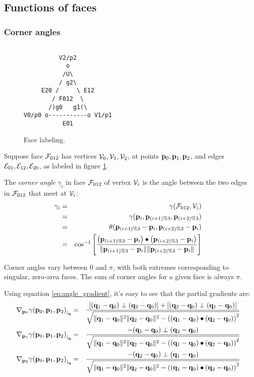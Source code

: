 \subsection{Functions of faces}
\label{sec:faces}



\subsubsection{Corner angles}
\label{sec:corner_angles}

\begin{figure}[!htp]
\centering
\begin{verbatim}

          V2/p2
            o
           /U\
          / g2\
     E20 /     \ E12
        / F012  \
       /)g0   g1(\
V0/p0 o-----------o V1/p1
           E01

\end{verbatim}
\caption{Face labeling.
\label{fig:face_labeling}}
\end{figure}

Suppose face ${\mathcal F}_{012}$ has vertices ${\mathcal V}_0, {\mathcal V}_1, {\mathcal V}_2$,
at points ${\mathbf p}_0, {\mathbf p}_1, {\mathbf p}_2$,
and edges ${\mathcal E}_{01}, {\mathcal E}_{12}, {\mathcal E}_{20}$,
as labeled in figure \ref{fig:face_labeling}.

The {\em corner angle} $\gamma_i$ in face ${\mathcal F}_{012}$ of vertex ${\mathcal V}_i$ is
the angle between the two edges in ${\mathcal F}_{012}$ that meet at ${\mathcal V}_i$:
\begin{eqnarray}
\gamma_i
& = & \gamma({\mathcal F}_{012},{\mathcal V}_i)
\\
& = & \gamma({\mathbf p}_i,{\mathbf p}_{(i+1) \% 3},{\mathbf p}_{(i+2) \% 3})
\nonumber
\\
& = & \theta({\mathbf p}_{(i+1) \% 3} - {\mathbf p}_i,{\mathbf p}_{(i+2) \% 3} - {\mathbf p}_i)
\nonumber
\\
& = &
\cos^{-1}
\left[
{ \left( {\mathbf p}_{(i+1) \% 3} - {\mathbf p}_i \right)
  \bullet
  \left( {\mathbf p}_{(i+2) \% 3} - {\mathbf p}_i \right) }
\over
{ \| {\mathbf p}_{(i+1) \% 3} - {\mathbf p}_i \|
  \| {\mathbf p}_{(i+2) \% 3} - {\mathbf p}_i \| }
\right]
\nonumber
\end{eqnarray}

Corner angles vary between $0$ and $\pi$, with both extremes
corresponding to singular, zero-area faces.
The sum of corner angles for a given face is always $\pi$.

Using equation \ref{eq:angle_gradient},
it's easy to see that the partial gradients are:
\begin{eqnarray}
{\mathbf \nabla}_{{\mathbf p}_0}{{\gamma({\mathbf p}_0,{\mathbf p}_1,{\mathbf p}_2)}}_{\mid_{{\mathbf q}}}
& = &
{{
\left[ ({\mathbf q}_1 -{\mathbf q}_0) \perp ({\mathbf q}_2 - {\mathbf q}_0) \right]
+
\left[ ({\mathbf q}_2 -{\mathbf q}_0) \perp ({\mathbf q}_1 - {\mathbf q}_0) \right]
}
\over
{ \sqrt{\|{\mathbf q}_1 - {\mathbf q}_0\|^2\|{\mathbf q}_2 - {\mathbf q}_0\|^2 -
\left( ({\mathbf q}_1 - {\mathbf q}_0) \bullet ({\mathbf q}_2 - {\mathbf q}_0) \right)^2 }}
}
\\
{\mathbf \nabla}_{{\mathbf p}_1}{{\gamma({\mathbf p}_0,{\mathbf p}_1,{\mathbf p}_2)}}_{\mid_{{\mathbf q}}}
& = &
{{-({\mathbf q}_1 -{\mathbf q}_0) \perp ({\mathbf q}_2 - {\mathbf q}_0)}
\over
{ \sqrt{\|{\mathbf q}_1 - {\mathbf q}_0\|^2\|{\mathbf q}_2 - {\mathbf q}_0\|^2 -
\left( ({\mathbf q}_1 - {\mathbf q}_0) \bullet ({\mathbf q}_2 - {\mathbf q}_0) \right)^2 }}
}
\nonumber
\\
{\mathbf \nabla}_{{\mathbf p}_2}{{\gamma({\mathbf p}_0,{\mathbf p}_1,{\mathbf p}_2)}}_{\mid_{{\mathbf q}}}
& = &
{{-({\mathbf q}_2 -{\mathbf q}_0) \perp ({\mathbf q}_1 - {\mathbf q}_0)}
\over
{ \sqrt{\|{\mathbf q}_1 - {\mathbf q}_0\|^2\|{\mathbf q}_2 - {\mathbf q}_0\|^2 -
\left( ({\mathbf q}_1 - {\mathbf q}_0) \bullet ({\mathbf q}_2 - {\mathbf q}_0) \right)^2 }}
}
\nonumber
\end{eqnarray}

